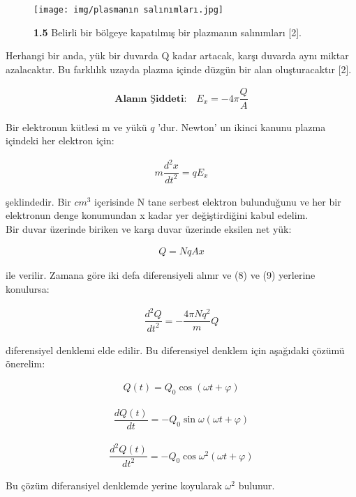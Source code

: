 \documentclass[a4paper,11pt]{article}
\begin{document}
\begin{figure}[h]
	\centering
	\texttt{[image: img/plasmanın salınımları.jpg]}
	\caption* {\textbf{1.5} Belirli bir bölgeye kapatılmış bir plazmanın salınımları [2].}
\end{figure}
Herhangi bir anda, yük bir duvarda Q kadar artacak, karşı duvarda aynı miktar azalacaktır. Bu farklılık uzayda plazma içinde düzgün bir alan oluşturacaktır  [2].

\begin{align}
\textbf{Alanın Şiddeti:} \quad E_{x} = -4 \pi \dfrac{Q}{A}
\end{align}

Bir elektronun kütlesi m ve yükü $ q $ 'dur. Newton' un ikinci kanunu plazma içindeki her elektron için: 

\begin{align}
m\dfrac{d^{2}x}{dt^{2}}=q E_{x}
\end{align}

şeklindedir. Bir $ cm^{3} $ içerisinde N tane serbest elektron bulunduğunu ve her bir \\ elektronun denge konumundan x kadar yer değiştirdiğini kabul edelim. \\
Bir duvar üzerinde biriken ve karşı duvar üzerinde eksilen net yük:

\begin{align}
Q = N q Ax
\end{align}

ile verilir. Zamana göre iki defa diferensiyeli alınır ve (8) ve (9) yerlerine konulursa:

\begin{align}
\dfrac{d^{2}Q}{dt^{2}} = - \dfrac{4 \pi N q^{2}}{m} Q 
\end{align}


diferensiyel denklemi elde edilir. Bu diferensiyel denklem için aşağıdaki çözümü önerelim:

\begin{align}
Q (t) = Q_{0} \cos (\omega t + \varphi)
\end{align}

\begin{align}
\dfrac{d Q (t)}{dt} = - Q_{0} \sin \omega (\omega t + \varphi)
\end{align}

\begin{align}
\dfrac{d^{2} Q (t)}{dt^{2}} = - Q_{0} \cos \omega^{2} (\omega t + \varphi)
\end{align}

Bu çözüm diferansiyel denklemde yerine koyularak $ \omega^{2} $ bulunur. \\
\end{document}
